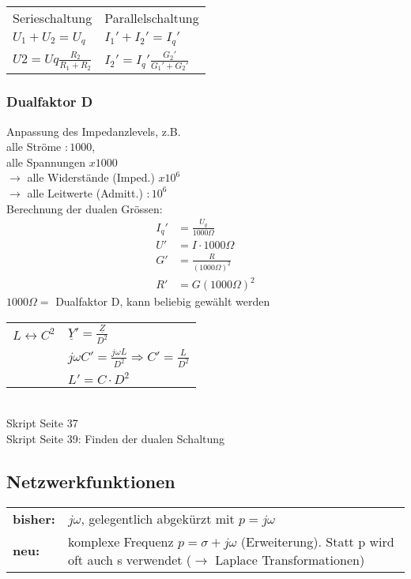 \begin{tabular}{ll}
Serieschaltung & Parallelschaltung \\
$U_1+U_2=U_q$
& $I_1'+I_2'=I_q'$\\ $U2=Uq\frac{R_2}{R_1+R_2}$ & $I_2'=I_q'\frac{G_2'}{G_1'+G_2'}$\\
\end{tabular}

\subsubsection{Dualfaktor D}
Anpassung des Impedanzlevels, z.B.\\
alle Ströme $:1000$,\\
alle Spannungen $x1000$\\
$\rightarrow$ alle Widerstände (Imped.) $x10^6$\\
$\rightarrow$ alle Leitwerte (Admitt.) $:10^6$\\
Berechnung der dualen Grössen:\\
\begin{align}
	I_q'&=\frac{U_q}{1000\Omega }\nonumber\\
	U'&=I\cdot 1000\Omega \nonumber\\
	G'&=\frac{R}{\left(1000\Omega\right)^2}\nonumber\\
	R'&=G\left(1000 \Omega\right)^2\nonumber
\end{align}
$1000 \Omega =$ Dualfaktor D, kann beliebig gewählt werden\\
\begin{tabular}{ll}
	$L \leftrightarrow C^2$ & $\underline{Y}'=\frac{\underline{Z}}{D^2}$\\
	& $j\omega C'=\frac{j \omega L}{D^2} \Rightarrow C'=\frac{L}{D^2}$\\
	& $L'=C\cdot D^2$
\end{tabular}\\
Skript Seite 37\\

Skript Seite 39: Finden der dualen Schaltung\\

\subsection{Netzwerkfunktionen}

\begin{tabular}{p{}p{}}
	\textbf{bisher:} & $j\omega$, gelegentlich abgekürzt mit $p=j\omega$ \\
	\textbf{neu:} & komplexe Frequenz $p=\sigma + j \omega$ (Erweiterung). Statt p
	wird oft auch s verwendet ($\rightarrow$ Laplace Transformationen)	\\
\end{tabular}

